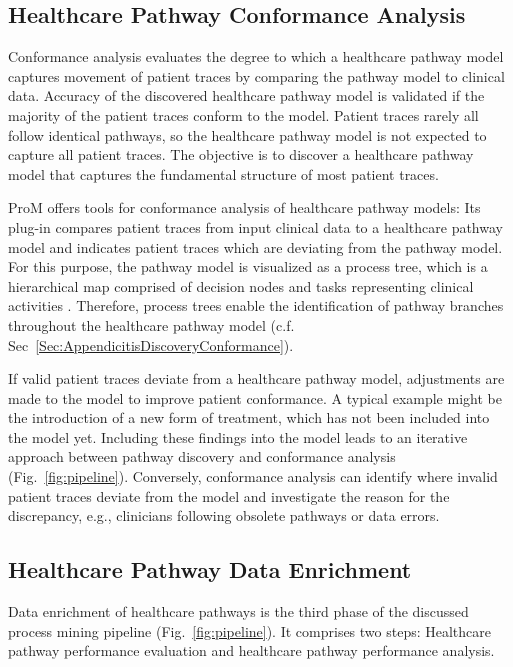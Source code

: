 
\subsection{Healthcare Pathway Conformance Analysis}
Conformance analysis evaluates the degree to which a healthcare pathway model captures movement of patient traces by comparing the pathway model to clinical data. 
Accuracy of the discovered healthcare pathway model is validated if the majority of the patient traces conform to the model. Patient traces rarely all follow identical pathways, so the healthcare pathway model is not expected to capture all patient traces. The objective is to discover a healthcare pathway model that captures the fundamental structure of most patient traces. 

ProM offers tools for conformance analysis of healthcare
pathway models: Its plug-in  compares
patient traces from input clinical data to a healthcare pathway model
and indicates patient traces which are deviating from the pathway
model.
For this purpose, the pathway model is visualized as a process tree,
which is a hierarchical map comprised of decision nodes and
tasks representing clinical activities
\cite{25a7fd818bf44606a903d9b78b95cdd3}.
Therefore, process trees enable the identification of pathway branches
throughout the healthcare pathway model (c.f. Sec~\ref{Sec:AppendicitisDiscoveryConformance}).

If valid patient traces deviate from a healthcare pathway model, 
adjustments are made to the model to improve patient conformance.
A typical example might be the introduction of a new form of
treatment, which has not been included into the model yet.
Including these findings into the model leads to an iterative approach
between pathway discovery and conformance analysis (Fig.~\ref{fig:pipeline}).
Conversely, conformance analysis can identify where invalid
patient traces deviate from the model and investigate the reason for
the discrepancy, e.g., clinicians following obsolete pathways or data errors.

\subsection{Healthcare Pathway Data Enrichment}
Data enrichment of healthcare pathways is the third phase of the
discussed process mining pipeline (Fig.~\ref{fig:pipeline}).
It comprises two steps: Healthcare pathway performance evaluation and
healthcare pathway performance analysis.

